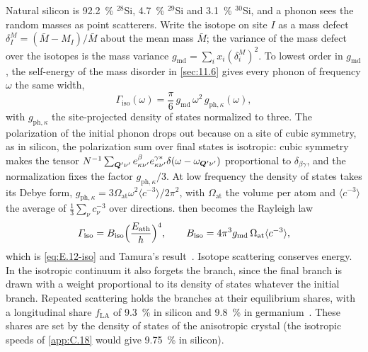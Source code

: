 Natural silicon is \SI{92.2}{\percent} $^{28}$Si, \SI{4.7}{\percent} $^{29}$Si and \SI{3.1}{\percent} $^{30}$Si, and a phonon sees the random masses as point scatterers. Write the isotope on site $I$ as a mass defect $\delta^M_I = (\bar M - M_I)/\bar M$ about the mean mass $\bar M$; the variance of the mass defect over the isotopes is the mass variance $g_{\mathrm{md}} = \sum_ix_i(\delta^M_i)^2$. To lowest order in $g_{\mathrm{md}}$, the self-energy of the mass disorder in \cref{sec:11.6} gives every phonon of frequency $\omega$ the same width,
\begin{equation}
  \varGamma_{\mathrm{iso}}(\omega) = \frac{\pi}{6}\,g_{\mathrm{md}}\,\omega^2\,g_{\mathrm{ph},\kappa}(\omega) ,
  \label{eq:20.2-isoborn}
\end{equation}
with $g_{\mathrm{ph},\kappa}$ the site-projected density of states normalized to three. The polarization of the initial phonon drops out because on a site of cubic symmetry, as in silicon, the polarization sum over final states is isotropic: cubic symmetry makes the tensor $N^{-1}\sum_{\bm{Q}'\nu'}e^{\beta}_{\kappa\nu'}e^{\gamma*}_{\kappa\nu'}\delta(\omega - \omega_{\bm{Q}'\nu'})$ proportional to $\delta_{\beta\gamma}$, and the normalization fixes the factor $g_{\mathrm{ph},\kappa}/3$. At low frequency the density of states takes its Debye form, $g_{\mathrm{ph},\kappa} = 3\Omega_{\mathrm{at}}\omega^2\langle c^{-3}\rangle/2\pi^2$, with $\Omega_{\mathrm{at}}$ the volume per atom and $\langle c^{-3}\rangle$ the average of $\frac13\sum_\nu c_\nu^{-3}$ over directions.  then becomes the Rayleigh law
\begin{equation}
  \varGamma_{\mathrm{iso}} = B_{\mathrm{iso}}\Bigl(\frac{E_{\mathrm{ath}}}{h}\Bigr)^4 , \qquad
  B_{\mathrm{iso}} = 4\pi^3g_{\mathrm{md}}\,\Omega_{\mathrm{at}}\langle c^{-3}\rangle ,
  \label{eq:20.2-rayleigh}
\end{equation}
which is \cref{eq:E.12-iso} and Tamura's result~\cite[Eq.~(4)]{hernandez2025modeling}. Isotope scattering conserves energy. In the isotropic continuum it also forgets the branch, since the final branch is drawn with a weight proportional to its density of states whatever the initial branch. Repeated scattering holds the branches at their equilibrium shares, with a longitudinal share $f_{\mathrm{LA}}$ of \SI{9.3}{\percent} in silicon and \SI{9.8}{\percent} in germanium~\cite[Sect.~2.2.2]{kelsey2023g4cmp}. These shares are set by the density of states of the anisotropic crystal (the isotropic speeds of \cref{app:C.18} would give \SI{9.75}{\percent} in silicon).

